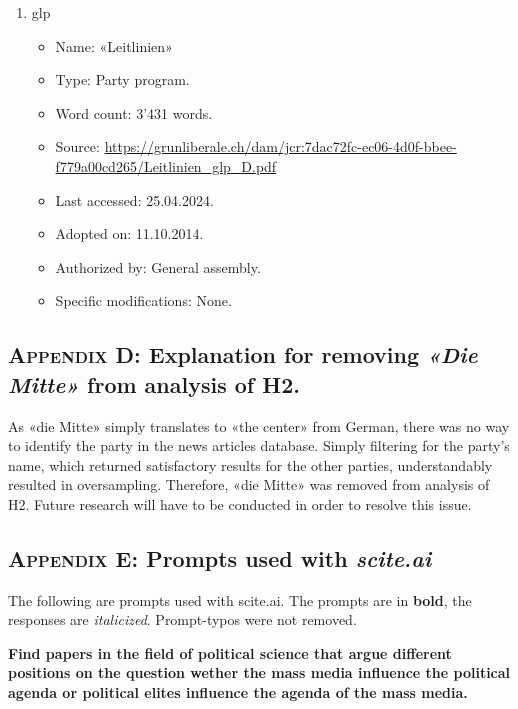 \documentclass[11pt,a4paper]{article}
\begin{document}
\begin{enumerate}
\item glp
    \begin{itemize}
        \item Name: «Leitlinien»
        \item Type: Party program.
        \item Word count: 3’431 words.
        \item Source: \url{https://grunliberale.ch/dam/jcr:7dac72fc-ec06-4d0f-bbee-f779a00cd265/Leitlinien_glp_D.pdf}
        \item Last accessed: 25.04.2024.
        \item Adopted on: 11.10.2014.
        \item Authorized by: General assembly.
        \item Specific modifications: None.
    \end{itemize}
\end{enumerate}

\newpage
\subsection*{\textsc{Appendix D}: Explanation for removing \textit{«Die Mitte»} from analysis of H2.}
As «die Mitte» simply translates to «the center» from German, there was no way to identify the party in the news articles database. Simply filtering for the party’s name, which returned satisfactory results for the other parties, understandably resulted in oversampling. Therefore, «die Mitte» was removed from analysis of H2. Future research will have to be conducted in order to resolve this issue.

\newpage
\subsection*{\textsc{Appendix E}: Prompts used with \textit{scite.ai}}
\setlength\parindent{0pt}

The following are prompts used with scite.ai. The prompts are in \textbf{bold}, the responses are \textit{italicized}. Prompt-typos were not removed.

\textbf{Find papers in the field of political science that argue different positions on the question wether the mass media influence the political agenda or political elites influence the agenda of the mass media.}
\end{document}
